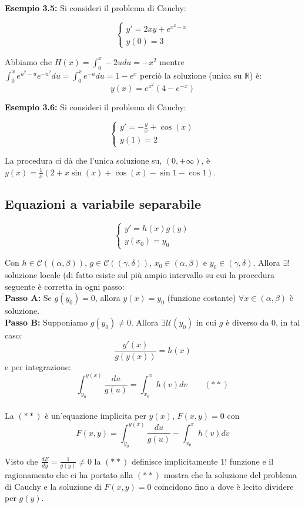 \documentclass[a4paper,11pt,titlepage]{book}
\begin{document}
\textbf{Esempio 3.5:} Si consideri il problema di Cauchy:


$$\begin{cases}
y'=2xy+e^{x^2-x}\\
y(0)=3
\end{cases}$$

Abbiamo che $H(x)=\int_{0}^x-2udu=-x^2$ mentre $\int_0^xe^{u^2-u}e^{-u^2}du=\int_0^xe^{-u}du=1-e^x$ perciò la soluzione (unica su $\mathbb{R}$) è: $$y(x)=e^{x^2}(4-e^{-x})$$

\textbf{Esempio 3.6:} Si consideri il problema di Cauchy:

$$\begin{cases}
y'=-\frac{y}{x}+\cos(x)\\
y(1)=2
\end{cases}$$

La procedura ci dà che l'unica soluzione su, $(0,+\infty)$, è $y(x)=\frac{1}{x}(2+x\sin(x)+\cos(x)-\sin 1-\cos1)$.\\

\subsection{Equazioni a variabile separabile}

$$\begin{cases}
y'=h(x)g(y)\\
y(x_0)=y_0
\end{cases}$$

Con $h\in\mathcal{C}((\alpha,\beta))$, $g\in\mathcal{C}((\gamma,\delta))$, $x_0\in(\alpha,\beta)$ e $y_0\in(\gamma,\delta)$. Allora $\exists !$ soluzione locale (di fatto esiste sul più ampio intervallo su cui la procedura seguente è corretta in ogni passo:\\

\textbf{Passo A:} Se $g(y_0)=0$, allora $y(x)=y_0$ (funzione costante) $\forall x\in(\alpha,\beta)$ è soluzione.\\

\textbf{Passo B:} Supponiamo $g(y_0)\ne 0$. Allora $\exists\mathcal{U}(y_0)$ in cui $g$ è diverso da $0$, in tal caso: $$\frac{y'(x)}{g(y(x))}=h(x)$$ e per integrazione: $$\boxed{\int_{y_0}^{y(x)}\frac{du}{g(u)}=\int_{x_0}^x h(v)dv} \qquad (**)$$\\

La $(**)$ è un'equazione implicita per $y(x)$, $F(x,y)=0$ con $$F(x,y)=\int_{y_0}^{y(x)}\frac{du}{g(u)} - \int_{x_0}^x h(v)dv$$

Visto che $\frac{dF}{dy}=\frac{1}{g(y)}\ne 0$ la $(**)$ definisce implicitamente $1!$ funzione e il ragionamento che ci ha portato alla $(**)$ mostra che la soluzione del problema di Cauchy e la soluzione di $F(x,y)=0$ coincidono fino a dove è lecito dividere per $g(y)$.\\
\end{document}
